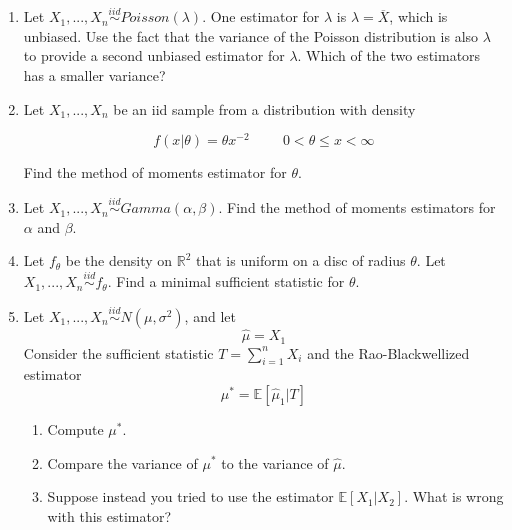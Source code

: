 \documentclass[11pt]{article}
\begin{document}
\begin{enumerate}

\item Let $X_1,...,X_n \overset{iid}{\sim} Poisson(\lambda)$. One estimator for $\lambda$ is $\widehat{\lambda} = \overline{X}$, which is unbiased. Use the fact that the variance of the Poisson distribution is also $\lambda$ to provide a second unbiased estimator for $\lambda$. Which of the two estimators has a smaller variance?

\bigskip

\item Let $X_1,...,X_n$ be an iid sample from a distribution with density

$$f(x|\theta) = \theta x^{-2} \hspace{1cm} 0 < \theta \leq x < \infty$$

Find the method of moments estimator for $\theta$.

\bigskip

\item Let $X_1,...,X_n \overset{iid}{\sim} Gamma(\alpha, \beta)$. Find the method of moments estimators for $\alpha$ and $\beta$.

\bigskip

\item Let $f_\theta$ be the density on $\mathbb{R}^2$ that is uniform on a disc of radius $\theta$. Let $X_1,...,X_n \overset{iid}{\sim} f_\theta$. Find a minimal sufficient statistic for $\theta$.

\bigskip

\item Let $X_1,...,X_n \overset{iid}{\sim} N(\mu, \sigma^2)$, and let 
$$\widehat{\mu} = X_1$$
Consider the sufficient statistic $T = \sum \limits_{i=1}^n X_i$ and the Rao-Blackwellized estimator
$$\mu^* = \mathbb{E}[\widehat{\mu}_1 | T]$$

\begin{enumerate}
\item Compute $\mu^*$.

\item Compare the variance of $\mu^*$ to the variance of $\widehat{\mu}$.

\item Suppose instead you tried to use the estimator $\mathbb{E}[X_1 | X_2]$. What is wrong with this estimator?
\end{enumerate}

\end{enumerate}
\end{document}
